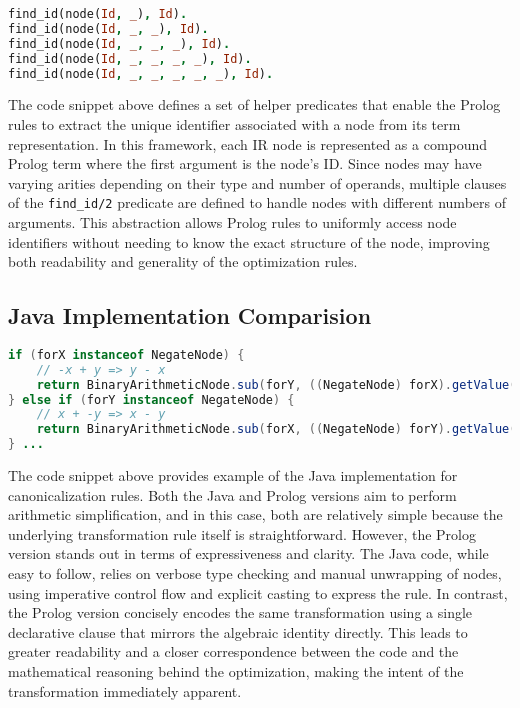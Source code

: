 \begin{lstlisting}[language=Prolog]
% These predicates are used to find the ID of a node.
find_id(node(Id, _), Id).
find_id(node(Id, _, _), Id).
find_id(node(Id, _, _, _), Id).
find_id(node(Id, _, _, _, _), Id).
find_id(node(Id, _, _, _, _, _), Id).
\end{lstlisting}

The code snippet above defines a set of helper predicates that enable the Prolog rules to extract the unique identifier associated with a node from its term representation.
In this framework, each IR node is represented as a compound Prolog term where the first argument is the node's ID.
Since nodes may have varying arities depending on their type and number of operands, multiple clauses of the \texttt{find\_id/2} predicate are defined to handle nodes with different numbers of arguments. 
This abstraction allows Prolog rules to uniformly access node identifiers without needing to know the exact structure of the node, improving both readability and generality of the optimization rules.

\subsection*{Java Implementation Comparision}
\begin{lstlisting}[language=Java]
if (forX instanceof NegateNode) {
    // -x + y => y - x
    return BinaryArithmeticNode.sub(forY, ((NegateNode) forX).getValue(), view);
} else if (forY instanceof NegateNode) {
    // x + -y => x - y
    return BinaryArithmeticNode.sub(forX, ((NegateNode) forY).getValue(), view);
} ...
\end{lstlisting}

The code snippet above provides example of the Java implementation for canonicalization rules.
Both the Java and Prolog versions aim to perform arithmetic simplification, and in this case, both are relatively simple because the underlying transformation rule itself is straightforward. 
However, the Prolog version stands out in terms of expressiveness and clarity. The Java code, while easy to follow, relies on verbose type checking and manual unwrapping of nodes, using imperative control flow and explicit casting to express the rule. In contrast, the Prolog version concisely encodes the same transformation using a single declarative clause that mirrors the algebraic identity directly. This leads to greater readability and a closer correspondence between the code and the mathematical reasoning behind the optimization, making the intent of the transformation immediately apparent.